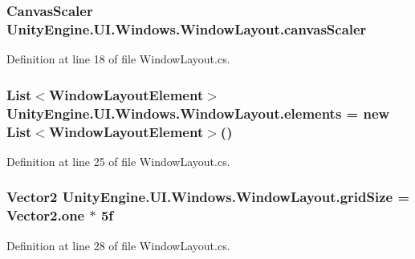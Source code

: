 \subsubsection[{canvas\+Scaler}]{\setlength{\rightskip}{0pt plus 5cm}Canvas\+Scaler Unity\+Engine.\+U\+I.\+Windows.\+Window\+Layout.\+canvas\+Scaler}\label{class_unity_engine_1_1_u_i_1_1_windows_1_1_window_layout_adb8edfb4d837229b10faa4293c644ad8}


Definition at line 18 of file Window\+Layout.\+cs.

\hypertarget{class_unity_engine_1_1_u_i_1_1_windows_1_1_window_layout_a6918fea3b497d45c24cdc650aa7a5887}{}
\subsubsection[{elements}]{\setlength{\rightskip}{0pt plus 5cm}List$<${\bf Window\+Layout\+Element}$>$ Unity\+Engine.\+U\+I.\+Windows.\+Window\+Layout.\+elements = new List$<${\bf Window\+Layout\+Element}$>$()}\label{class_unity_engine_1_1_u_i_1_1_windows_1_1_window_layout_a6918fea3b497d45c24cdc650aa7a5887}


Definition at line 25 of file Window\+Layout.\+cs.

\hypertarget{class_unity_engine_1_1_u_i_1_1_windows_1_1_window_layout_a770d4579f84d0fe15d558e8bf0cf74d0}{}
\subsubsection[{grid\+Size}]{\setlength{\rightskip}{0pt plus 5cm}Vector2 Unity\+Engine.\+U\+I.\+Windows.\+Window\+Layout.\+grid\+Size = Vector2.\+one $\ast$ 5f}\label{class_unity_engine_1_1_u_i_1_1_windows_1_1_window_layout_a770d4579f84d0fe15d558e8bf0cf74d0}


Definition at line 28 of file Window\+Layout.\+cs.

\hypertarget{class_unity_engine_1_1_u_i_1_1_windows_1_1_window_layout_a170e4ae580d5ea419e20dc0b6296179e}{}
